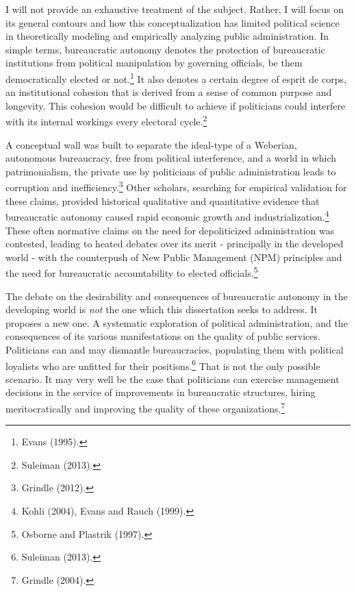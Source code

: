 \documentclass[12pt,]{article}
\let\rmarkdownfootnote\footnote%
\def\footnote{\protect\rmarkdownfootnote}
\begin{document}
I will not provide an exhaustive treatment of the subject. Rather, I
will focus on its general contours and how this conceptualization has
limited political science in theoretically modeling and empirically
analyzing public administration. In simple terms, bureaucratic autonomy
denotes the protection of bureaucratic institutions from political
manipulation by governing officials, be them democratically elected or
not.\footnote{Evans (1995).} It also denotes a certain degree of esprit
de corps, an institutional cohesion that is derived from a sense of
common purpose and longevity. This cohesion would be difficult to
achieve if politicians could interfere with its internal workings every
electoral cycle.\footnote{Suleiman (2013).}

A conceptual wall was built to separate the ideal-type of a Weberian,
autonomous bureaucracy, free from political interference, and a world in
which patrimonialism, the private use by politicians of public
administration leads to corruption and inefficiency.\footnote{Grindle
  (2012).} Other scholars, searching for empirical validation for these
claims, provided historical qualitative and quantitative evidence that
bureaucratic autonomy caused rapid economic growth and
industrialization.\footnote{Kohli (2004), Evans and Rauch (1999).} These
often normative claims on the need for depoliticized administration was
contested, leading to heated debates over its merit - principally in the
developed world - with the counterpush of New Public Management (NPM)
principles and the need for bureaucratic accountability to elected
officials.\footnote{Osborne and Plastrik (1997).}

The debate on the desirability and consequences of bureaucratic autonomy
in the developing world is \emph{not} the one which this dissertation
seeks to address. It proposes a new one. A systematic exploration of
political administration, and the consequences of its various
manifestations on the quality of public services. Politicians can and
may dismantle bureaucracies, populating them with political loyalists
who are unfitted for their positions.\footnote{Suleiman (2013).} That is
not the only possible scenario. It may very well be the case that
politicians can exercise management decisions in the service of
improvements in bureaucratic structures, hiring meritocratically and
improving the quality of these organizations.\footnote{Grindle (2004).}
\end{document}
